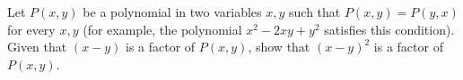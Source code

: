Let $ P(x,y)$ be a polynomial in two variables $ x,y$ such that $ P(x,y)=P(y,x)$ for every $ x,y$ (for example, the polynomial $ x^2-2xy+y^2$ satisfies this condition). Given that $ (x-y)$ is a factor of $ P(x,y)$,  show that $ (x-y)^2$ is a factor of $ P(x,y)$.